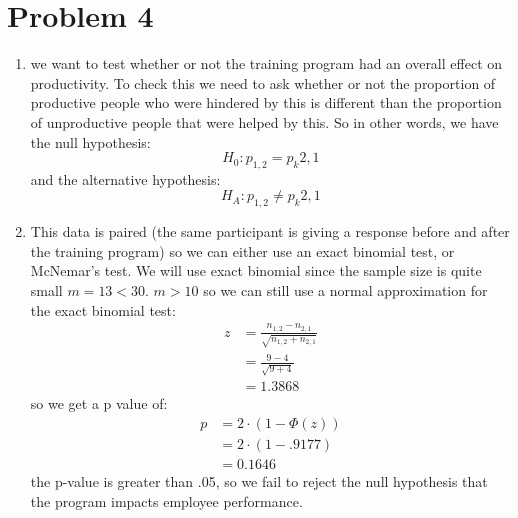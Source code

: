 \documentclass{article}
\begin{document}
\section*{Problem 4}
\begin{enumerate}
\item we want to test whether or not the training program had an overall effect on productivity. To check this we need to ask whether or not the proportion of productive people who were hindered by this is different than the proportion of unproductive people that were helped by this. So in other words, we have the null hypothesis: \\
\[
H_0: p_{1,2} = p_k{2,1}
\]
and the alternative hypothesis: \\
\[
H_A: p_{1,2} \neq p_k{2,1}
\]
\item This data is paired (the same participant is giving a response before and after the training program) so we can either use an exact binomial test, or McNemar's test. We will use exact binomial since the sample size is quite small $m = 13 < 30$. $m > 10$ so we can still use a normal approximation for the exact binomial test: \\
\begin{align*}
z &= \frac{n_{1,2} - n_{2,1}}{\sqrt{n_{1,2} + n_{2,1}}} \\
&= \frac{9 - 4}{\sqrt{9 + 4}} \\
&= 1.3868
\end{align*}
so we get a p value of: \\
\begin{align*}
p &= 2 \cdot (1 - \Phi(z)) \\
&= 2 \cdot (1 - .9177) \\
&= 0.1646
\end{align*}
the p-value is greater than .05, so we fail to reject the null hypothesis that the program impacts employee performance.
\end{enumerate}
\end{document}
